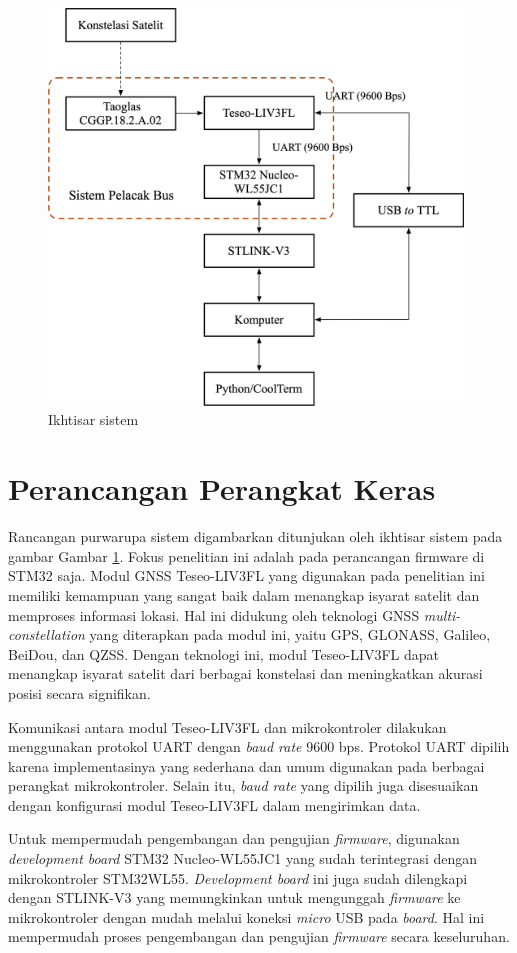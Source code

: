 \begin{figure}[H]
	\centering
	\includegraphics[width=11cm]{contents/chapter-3/system-overview.png}
	\caption{Ikhtisar sistem}
	\label{Fig: system-overview}
\end{figure}

\section{Perancangan Perangkat Keras}
Rancangan purwarupa sistem digambarkan ditunjukan oleh ikhtisar sistem pada gambar Gambar  \ref{Fig: system-overview}. Fokus penelitian ini adalah pada perancangan firmware di STM32 saja.  Modul GNSS Teseo\hyp{}LIV3FL yang digunakan pada penelitian ini memiliki kemampuan yang sangat baik dalam menangkap isyarat satelit dan memproses informasi lokasi. Hal ini didukung oleh teknologi GNSS \textit{multi-constellation} yang diterapkan pada modul ini, yaitu GPS, GLONASS, Galileo, BeiDou, dan QZSS. Dengan teknologi ini, modul Teseo\hyp{}LIV3FL dapat menangkap isyarat satelit dari berbagai konstelasi dan meningkatkan akurasi posisi secara signifikan.

Komunikasi antara modul Teseo\hyp{}LIV3FL dan mikrokontroler dilakukan menggunakan protokol UART dengan \textit{baud rate} 9600 bps. Protokol UART dipilih karena implementasinya yang sederhana dan umum digunakan pada berbagai perangkat mikrokontroler. Selain itu, \textit{baud rate} yang dipilih juga disesuaikan dengan konfigurasi modul Teseo\hyp{}LIV3FL dalam mengirimkan data.

Untuk mempermudah pengembangan dan pengujian \textit{firmware}, digunakan \textit{development board} STM32 Nucleo-WL55JC1 yang sudah terintegrasi dengan mikrokontroler STM32WL55. \textit{Development board} ini juga sudah dilengkapi dengan STLINK-V3 yang memungkinkan untuk mengunggah \textit{firmware} ke mikrokontroler dengan mudah melalui koneksi \textit{micro} USB pada \textit{board}. Hal ini mempermudah proses pengembangan dan pengujian \textit{firmware} secara keseluruhan.

